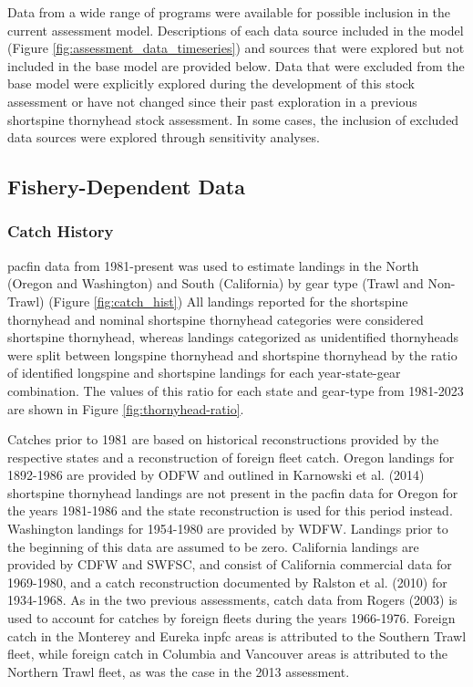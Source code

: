 \documentclass[11pt,
  english,
  letterpaper,
]{article}
\begin{document}
Data from a wide range of programs were available for possible inclusion in the current assessment model. Descriptions of each data source included in the model (Figure \ref{fig:assessment_data_timeseries}) and sources that were explored but not included in the base model are provided below. Data that were excluded from the base model were explicitly explored during the development of this stock assessment or have not changed since their past exploration in a previous shortspine thornyhead stock assessment. In some cases, the inclusion of excluded data sources were explored through sensitivity analyses.

\hypertarget{fishery-dependent-data}{%
\subsection{Fishery-Dependent Data}\label{fishery-dependent-data}}

\hypertarget{catch-history}{%
\subsubsection{Catch History}\label{catch-history}}

\Gls{pacfin} data from 1981-present was used to estimate landings in the North (Oregon and Washington) and South (California) by gear type (Trawl and Non-Trawl) (Figure \ref{fig:catch_hist}) All landings reported for the shortspine thornyhead and nominal shortspine thornyhead categories were considered shortspine thornyhead, whereas landings categorized as unidentified thornyheads were split between longspine thornyhead and shortspine thornyhead by the ratio of identified longspine and shortspine landings for each year-state-gear combination. The values of this ratio for each state and gear-type from 1981-2023 are shown in Figure \ref{fig:thornyhead-ratio}.

Catches prior to 1981 are based on historical reconstructions provided by the respective states and a reconstruction of foreign fleet catch. Oregon landings for 1892-1986 are provided by ODFW and outlined in Karnowski et al. (2014) shortspine thornyhead landings are not present in the \gls{pacfin} data for Oregon for the years 1981-1986 and the state reconstruction is used for this period instead. Washington landings for 1954-1980 are provided by WDFW. Landings prior to the beginning of this data are assumed to be zero. California landings are provided by CDFW and SWFSC, and consist of California commercial data for 1969-1980, and a catch reconstruction documented by Ralston et al. (2010) for 1934-1968. As in the two previous assessments, catch data from Rogers (2003) is used to account for catches by foreign fleets during the years 1966-1976. Foreign catch in the Monterey and Eureka \gls{inpfc} areas is attributed to the Southern Trawl fleet, while foreign catch in Columbia and Vancouver areas is attributed to the Northern Trawl fleet, as was the case in the 2013 assessment.
\end{document}
